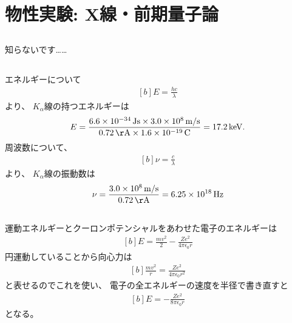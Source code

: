 \documentclass[../../sp_2013.tex]{subfiles}
\begin{document}
\section{物性実験: X線・前期量子論}
\subsection{}
知らないです……
\subsection{}
エネルギーについて
\begin{equation}\begin{aligned}[b]
    E = \frac{hc}{\lambda}
\end{aligned}\end{equation}
より、
\(K_\alpha\)線の持つエネルギーは
\begin{equation}\begin{aligned}[b]
    E = \frac{
        6.6\times 10^{-34}\,\si{Js}\times 3.0\times 10^8 \,\si{m/s}
    }{0.72 \,\si{\AA} \times 1.6\times 10^{-19}\,\si{C}}
    = 17.2 \,\si{keV}.
\end{aligned}\end{equation}
周波数について、
\begin{equation}\begin{aligned}[b]
    \nu = \frac{c}{\lambda}
\end{aligned}\end{equation}
より、
\(K_\alpha\)線の振動数は
\begin{equation}\begin{aligned}[b]
    \nu = \frac{3.0\times 10^8 \,\si{m/s}}{0.72 \,\si{\AA}} = 6.25 \times 10^{18}\,\si{Hz}
\end{aligned}\end{equation}

\subsection{}
運動エネルギーとクーロンポテンシャルをあわせた電子のエネルギーは
\begin{equation}\begin{aligned}[b]
    E = \frac{mv^2}{2}-\frac{Ze^2}{4\pi\epsilon_0 r}
\end{aligned}\end{equation}
円運動していることから向心力は
\begin{equation}\begin{aligned}[b]
    \frac{mv^2}{r} = \frac{Ze^2}{4\pi\epsilon_0r^2}
\end{aligned}\end{equation}
と表せるのでこれを使い、
電子の全エネルギーの速度を半径で書き直すと
\begin{equation}\begin{aligned}[b]
    E = -\frac{Ze^2}{8\pi\epsilon_0 r}
\end{aligned}\end{equation}
となる。
\end{document}
